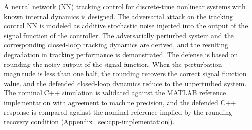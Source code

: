 A neural network (NN) tracking control for discrete-time nonlinear systems
with known internal dynamics is designed. The adversarial attack on the
tracking control NN is modeled as additive stochastic noise injected into
the output of the signal function of the controller. The adversarially perturbed system
and the corresponding closed-loop tracking dynamics are derived, and the
resulting degradation in tracking performance is demonstrated. The defense
is based on rounding the noisy output of the signal function. When the
perturbation magnitude is less than one half, the rounding recovers the
correct signal function value, and the defended closed-loop dynamics reduce
to the unperturbed system. The nominal C++ simulation is validated against
the MATLAB reference implementation with agreement to machine
precision, and the defended C++ response is compared against the nominal
reference implied by the rounding-recovery condition
(Appendix~\ref{sec:cpp-implementation}).
